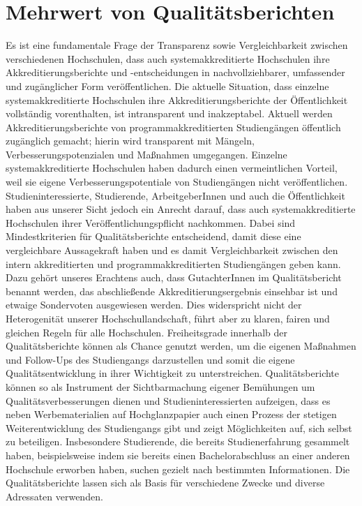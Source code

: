 \documentclass[DIV=calc]{scrartcl}
\begin{document}
\section*{Mehrwert von Qualitätsberichten}
Es ist eine fundamentale Frage der Transparenz sowie Vergleichbarkeit zwischen verschiedenen Hochschulen, dass auch systemakkreditierte Hochschulen ihre Akkreditierungsberichte und -entscheidungen in nachvollziehbarer, umfassender und zugänglicher Form veröffentlichen. 
Die aktuelle Situation, dass einzelne systemakkreditierte Hochschulen ihre Akkreditierungsberichte der Öffentlichkeit vollständig vorenthalten, ist intransparent und inakzeptabel. 
Aktuell werden Akkreditierungsberichte von programmakkreditierten Studiengängen öffentlich zugänglich gemacht; hierin wird transparent mit Mängeln, Verbesserungspotenzialen und Maßnahmen umgegangen. 
Einzelne systemakkreditierte Hochschulen haben dadurch einen vermeintlichen Vorteil, weil sie eigene Verbesserungspotentiale von Studiengängen nicht veröffentlichen. 
Studieninteressierte, Studierende, ArbeitgeberInnen und auch die Öffentlichkeit haben aus unserer Sicht jedoch ein Anrecht darauf, dass auch systemakkreditierte Hochschulen ihrer Veröffentlichungspflicht nachkommen. 
Dabei sind Mindestkriterien für Qualitätsberichte entscheidend, damit diese eine vergleichbare Aussagekraft haben und es damit Vergleichbarkeit zwischen den intern akkreditierten und programmakkreditierten Studiengängen geben kann. 
Dazu gehört unseres Erachtens auch, dass GutachterInnen im Qualitätsbericht benannt werden, das abschließende Akkreditierungsergebnis einsehbar ist und etwaige Sondervoten ausgewiesen werden. 
Dies widerspricht nicht der Heterogenität unserer Hochschullandschaft, führt aber zu klaren, fairen und gleichen Regeln für alle Hochschulen. 
Freiheitsgrade innerhalb der Qualitätsberichte können als Chance genutzt werden, um die eigenen Maßnahmen und Follow-Ups des Studiengangs darzustellen und somit die eigene Qualitätsentwicklung in ihrer Wichtigkeit zu unterstreichen. 
Qualitätsberichte können so als Instrument der Sichtbarmachung eigener Bemühungen um Qualitätsverbesserungen dienen und Studieninteressierten aufzeigen, dass es neben Werbematerialien auf Hochglanzpapier 
auch einen Prozess der stetigen Weiterentwicklung des Studiengangs gibt und zeigt Möglichkeiten auf, sich selbst zu beteiligen. 
Insbesondere Studierende, die bereits Studienerfahrung gesammelt haben, beispielsweise indem sie bereits einen Bachelorabschluss an einer anderen Hochschule erworben haben, 
suchen gezielt nach bestimmten Informationen. 
Die Qualitätsberichte lassen sich als Basis für verschiedene Zwecke und diverse Adressaten verwenden. 
\end{document}
